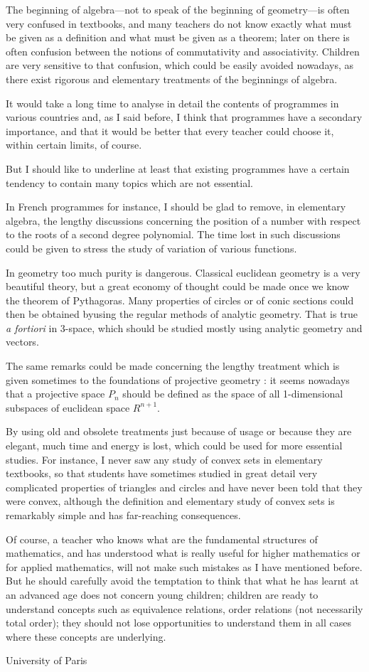 The beginning of algebra---not to speak of the beginning of geometry---is often very confused in textbooks, and many teachers do not know exactly what must be given as a definition and what must be given as a theorem; later on there is often confusion between the notions of commutativity and associativity. Children are very sensitive to that confusion, which could be easily avoided nowadays, as there exist rigorous and elementary treatments of the beginnings of algebra.

It would take a long time to analyse in detail the contents of programmes in various countries and, as I said before, I think that programmes have a secondary importance, and that it would be better that every teacher could choose it, within certain limits, of course.

But I should like to underline at least that existing programmes have a certain tendency to contain many topics which are not essential.

In French programmes for instance, I should be glad to remove, in elementary algebra, the lengthy discussions concerning the position of a number with respect to the roots of a second degree polynomial. The time lost in such discussions could be given to stress the study of variation of various functions.

In geometry too much purity is dangerous. Classical euclidean geometry is a very beautiful theory, but a great economy of thought could be made once we know the theorem of Pythagoras. Many properties of circles or of conic sections could then be obtained by\pageoriginale using the regular methods of analytic geometry. That is true {\em a fortiori} in 3-space, which should be studied mostly using analytic geometry and vectors.

The same remarks could be made concerning the lengthy treatment which is given sometimes to the foundations of projective geometry : it seems nowadays that a projective space $P_{n}$ should be defined as the space of all 1-dimensional subspaces of euclidean space $R^{n+1}$.

By using old and obsolete treatments just because of usage or because they are elegant, much time and energy is lost, which could be used for more essential studies. For instance, I never saw any study of convex sets in elementary textbooks, so that students have sometimes studied in great detail very complicated properties of triangles and circles and have never been told that they were convex, although the definition and elementary study of convex sets is remarkably simple and has far-reaching consequences.

Of course, a teacher who knows what are the fundamental structures of mathematics, and has understood what is really useful for higher mathematics or for applied mathematics, will not make such mistakes as I have mentioned before. But he should carefully avoid the temptation to think that what he has learnt at an advanced age does not concern young children; children are ready to understand concepts such as equivalence relations, order relations (not necessarily total order); they should not lose opportunities to understand them in all cases where these concepts are underlying.

\bigskip
\medskip
{\fontsize{9pt}{11pt}\selectfont
University of Paris}\relax
